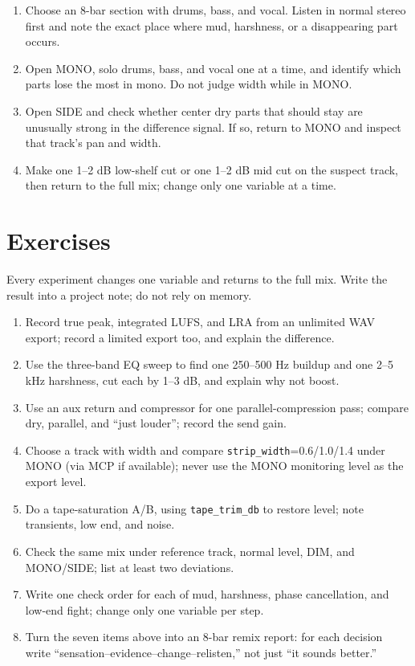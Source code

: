 \begin{enumerate}
  \item Choose an 8-bar section with drums, bass, and vocal. Listen in normal stereo first and note the exact place where mud, harshness, or a disappearing part occurs.
  \item Open MONO, solo drums, bass, and vocal one at a time, and identify which parts lose the most in mono. Do not judge width while in MONO.
  \item Open SIDE and check whether center dry parts that should stay are unusually strong in the difference signal. If so, return to MONO and inspect that track's pan and width.
  \item Make one 1--2 dB low-shelf cut or one 1--2 dB mid cut on the suspect track, then return to the full mix; change only one variable at a time.
\end{enumerate}

\section{Exercises}


\begin{exercise}
Every experiment changes one variable and returns to the full mix. Write the result into a project note; do not rely on memory.

\begin{enumerate}
  \item Record true peak, integrated LUFS, and LRA from an unlimited WAV export; record a limited export too, and explain the difference.
  \item Use the three-band EQ sweep to find one 250--500 Hz buildup and one 2--5 kHz harshness, cut each by 1--3 dB, and explain why not boost.
  \item Use an aux return and compressor for one parallel-compression pass; compare dry, parallel, and ``just louder''; record the send gain.
  \item Choose a track with width and compare \texttt{strip\_width}=0.6/1.0/1.4 under MONO (via MCP if available); never use the MONO monitoring level as the export level.
  \item Do a tape-saturation A/B, using \texttt{tape\_trim\_db} to restore level; note transients, low end, and noise.
  \item Check the same mix under reference track, normal level, DIM, and MONO/SIDE; list at least two deviations.
  \item Write one check order for each of mud, harshness, phase cancellation, and low-end fight; change only one variable per step.
  \item Turn the seven items above into an 8-bar remix report: for each decision write ``sensation--evidence--change--relisten,'' not just ``it sounds better.''
\end{enumerate}
\end{exercise}

